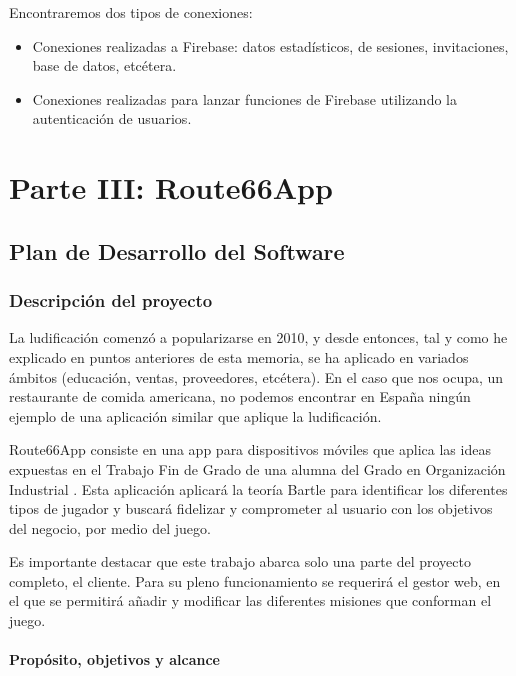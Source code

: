 \documentclass[twoside]{report}
\begin{document}
Encontraremos dos tipos de conexiones:

\begin{itemize}
\item Conexiones realizadas a Firebase: datos estadísticos, de sesiones, invitaciones, base de datos, etcétera.

\item Conexiones realizadas para lanzar funciones de Firebase utilizando la autenticación de usuarios.

\end{itemize}


\chapter{Parte III: Route66App}
\section{Plan de Desarrollo del Software}
\subsection{Descripción del proyecto}

La ludificación comenzó a popularizarse en 2010\cite{anatfg}, y desde entonces, tal y como he explicado en puntos anteriores de esta memoria, se ha aplicado en variados ámbitos (educación, ventas, proveedores, etcétera). En el caso que nos ocupa, un restaurante de comida americana, no podemos encontrar en España ningún ejemplo de una aplicación similar que aplique la ludificación.

Route66App consiste en una app para dispositivos móviles que aplica las ideas expuestas en el Trabajo Fin de Grado de una alumna del Grado en Organización Industrial \cite{cristinatfg}. Esta aplicación aplicará la teoría Bartle para identificar los diferentes tipos de jugador y buscará fidelizar y comprometer al usuario con los objetivos del negocio, por medio del juego.

Es importante destacar que este trabajo abarca solo una parte del proyecto completo, el cliente. Para su pleno funcionamiento se requerirá el gestor web, en el que se permitirá añadir y modificar las diferentes misiones que conforman el juego. 
 
\subsubsection{Propósito, objetivos y alcance}
\end{document}
